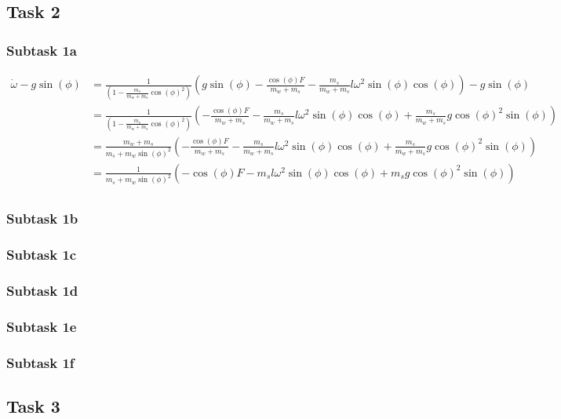 \documentclass[a4paper, 12pt]{scrartcl}
\begin{document}
\subsection{Task 2}
\subsubsection{Subtask 1a}
\begin{equation}
	\begin{aligned}
	\dot{\omega} - g\sin(\phi) 
	&= \frac{1}{\left(1-\frac{m_s}{m_w + m_s} \cos(\phi)^2\right)} \left( g \sin(\phi) -  \frac{\cos(\phi)F}{m_w + m_s} - \frac{m_s}{m_w + m_s} {l \omega^2} \sin(\phi) \cos(\phi) \right) - g\sin(\phi)\\
	&= \frac{1}{\left(1-\frac{m_s}{m_w + m_s} \cos(\phi)^2\right)} \left( -\frac{\cos(\phi)F}{m_w + m_s} - \frac{m_s}{m_w + m_s} {l \omega^2} \sin(\phi) \cos(\phi) +\frac{m_s}{m_w + m_s} g\cos(\phi)^2 \sin(\phi) \right)\\
	&= \frac{m_w + m_s}{m_s+ m_w\sin(\phi)^2} \left( -\frac{\cos(\phi)F}{m_w + m_s} - \frac{m_s}{m_w + m_s} {l \omega^2} \sin(\phi) \cos(\phi) +\frac{m_s}{m_w + m_s} g\cos(\phi)^2 \sin(\phi) \right)\\
	&= \frac{1}{m_s+ m_w\sin(\phi)^2} \left( -\cos(\phi)F - m_s {l \omega^2} \sin(\phi) \cos(\phi) +m_s g\cos(\phi)^2 \sin(\phi) \right)\\
	\end{aligned}
\end{equation}

\subsubsection{Subtask 1b}
\subsubsection{Subtask 1c}
\subsubsection{Subtask 1d}
\subsubsection{Subtask 1e}
\subsubsection{Subtask 1f}

\subsection{Task 3}
\end{document}
